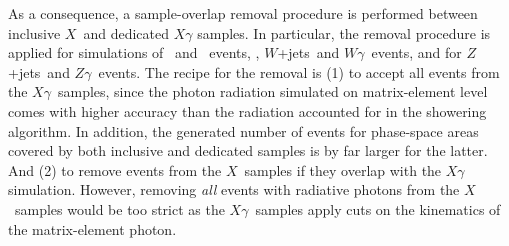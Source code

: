 As a consequence, a sample-overlap removal procedure is performed between inclusive $X$~and dedicated $X\gamma$ samples.
In particular, the removal procedure is applied for simulations of \ttbar~and \tty~events, \tWy, $W$+jets~and $W\gamma$~events, and for $Z$+jets~and $Z\gamma$~events.
The recipe for the removal is (1) to accept all events from the $X\gamma$~samples, since the photon radiation simulated on matrix-element level comes with higher accuracy than the radiation accounted for in the showering algorithm.
In addition, the generated number of events for phase-space areas covered by both inclusive and dedicated samples is by far larger for the latter.
And (2) to remove events from the $X$~samples if they overlap with the $X\gamma$ simulation.
However, removing \emph{all} events with radiative photons from the $X$~samples would be too strict as the $X\gamma$~samples apply cuts on the kinematics of the matrix-element photon.

